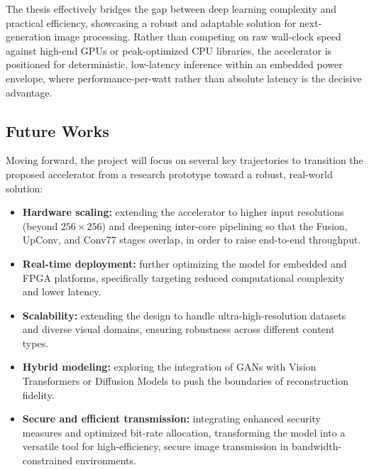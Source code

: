 The thesis effectively bridges the gap between deep learning complexity and practical efficiency, showcasing a robust and adaptable solution for next-generation image processing. Rather than competing on raw wall-clock speed against high-end GPUs or peak-optimized CPU libraries, the accelerator is positioned for deterministic, low-latency inference within an embedded power envelope, where performance-per-watt rather than absolute latency is the decisive advantage.

\subsection*{Future Works}

Moving forward, the project will focus on several key trajectories to transition the proposed accelerator from a research prototype toward a robust, real-world solution:
\begin{itemize}
    \item \textbf{Hardware scaling:} extending the accelerator to higher input resolutions (beyond $256\times256$) and deepening inter-core pipelining so that the Fusion, UpConv, and Conv77 stages overlap, in order to raise end-to-end throughput.
    \item \textbf{Real-time deployment:} further optimizing the model for embedded and FPGA platforms, specifically targeting reduced computational complexity and lower latency.
    \item \textbf{Scalability:} extending the design to handle ultra-high-resolution datasets and diverse visual domains, ensuring robustness across different content types.
    \item \textbf{Hybrid modeling:} exploring the integration of GANs with Vision Transformers or Diffusion Models to push the boundaries of reconstruction fidelity.
    \item \textbf{Secure and efficient transmission:} integrating enhanced security measures and optimized bit-rate allocation, transforming the model into a versatile tool for high-efficiency, secure image transmission in bandwidth-constrained environments.
\end{itemize}
